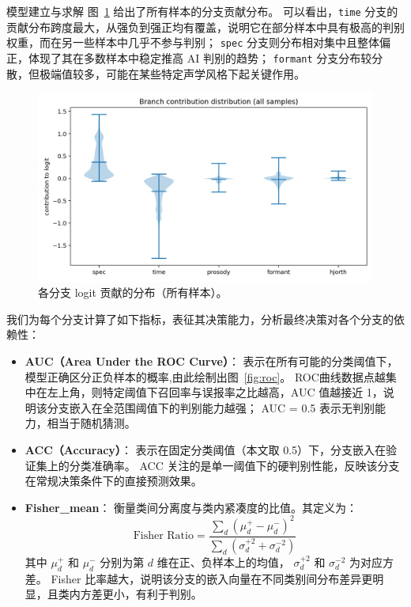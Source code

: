 \documentclass[aspectratio=169]{beamer}
\begin{document}
\begin{frame}{模型建立与求解}
图~\ref{fig:contrib_violin} 给出了所有样本的分支贡献分布。
可以看出，\texttt{time} 分支的贡献分布跨度最大，从强负到强正均有覆盖，说明它在部分样本中具有极高的判别权重，而在另一些样本中几乎不参与判别；
\texttt{spec} 分支则分布相对集中且整体偏正，体现了其在多数样本中稳定推高 AI 判别的趋势；
\texttt{formant} 分支分布较分散，但极端值较多，可能在某些特定声学风格下起关键作用。

\begin{figure}[H]
  \centering
  \includegraphics[width=.75\linewidth]{images_in_paper/contrib_violin_all.png}
  \caption{各分支 logit 贡献的分布（所有样本）。}
  \label{fig:contrib_violin}
\end{figure}

我们为每个分支计算了如下指标，表征其决策能力，分析最终决策对各个分支的依赖性：

\begin{itemize}
  \item \textbf{AUC（Area Under the ROC Curve）}：
  表示在所有可能的分类阈值下，模型正确区分正负样本的概率,由此绘制出图~\ref{fig:roc}。
  ROC曲线数据点越集中在左上角，则特定阈值下召回率与误报率之比越高，AUC 值越接近 1，说明该分支嵌入在全范围阈值下的判别能力越强；
  AUC = 0.5 表示无判别能力，相当于随机猜测。

  \item \textbf{ACC（Accuracy）}：
  表示在固定分类阈值（本文取 0.5）下，分支嵌入在验证集上的分类准确率。
  ACC 关注的是单一阈值下的硬判别性能，反映该分支在常规决策条件下的直接预测效果。

  \item \textbf{Fisher\_mean}：
  衡量类间分离度与类内紧凑度的比值。其定义为：
  \[
  \text{Fisher Ratio} = \frac{\sum_d (\mu_d^{+} - \mu_d^{-})^2}{\sum_d (\sigma_d^{+2} + \sigma_d^{-2})}
  \]
  其中 $\mu_d^{+}$ 和 $\mu_d^{-}$ 分别为第 $d$ 维在正、负样本上的均值，
  $\sigma_d^{+2}$ 和 $\sigma_d^{-2}$ 为对应方差。
  Fisher 比率越大，说明该分支的嵌入向量在不同类别间分布差异更明显，且类内方差更小，有利于判别。


\end{itemize}
\end{frame}
\end{document}
